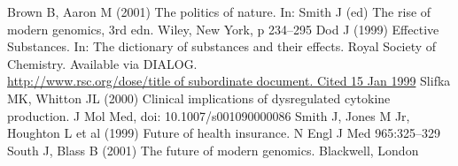 % 
%
%
% 
% 
%
\begin{thebibliography}{99.}
 Brown B, Aaron M (2001) The politics of nature. In: Smith J (ed) The rise of modern genomics, 3rd edn. Wiley, New York, p 234--295  
%
 Dod J (1999) Effective Substances. In: The dictionary of substances and their effects. Royal Society of Chemistry. Available via DIALOG. \\
\url{http://www.rsc.org/dose/title of subordinate document. Cited 15 Jan 1999}
%
 Slifka MK, Whitton JL (2000) Clinical implications of dysregulated cytokine production. J Mol Med, doi: 10.1007/s001090000086
%
 Smith J, Jones M Jr, Houghton L et al (1999) Future of health insurance. N Engl J Med 965:325--329
%
 South J, Blass B (2001) The future of modern genomics. Blackwell, London 
%
\end{thebibliography}